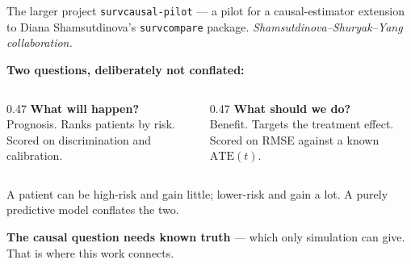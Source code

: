 \documentclass[aspectratio=169]{beamer}
\begin{document}
\begin{frame}{The larger project}
  \small
  \texttt{survcausal-pilot} --- a pilot for a causal-estimator extension to Diana
  Shamsutdinova's \texttt{survcompare} package.
  \emph{Shamsutdinova--Shuryak--Yang collaboration.}

  \vspace{0.6em}
  \textbf{Two questions, deliberately not conflated:}
  \begin{columns}[T,totalwidth=\textwidth]
    \begin{column}{0.47\textwidth}
      \textbf{What will happen?}\\
      Prognosis. Ranks patients by risk. Scored on discrimination and calibration.
    \end{column}
    \begin{column}{0.47\textwidth}
      \textbf{What should we do?}\\
      Benefit. Targets the treatment effect. Scored on RMSE against a known
      $\mathrm{ATE}(t)$.
    \end{column}
  \end{columns}

  \vspace{0.6em}
  A patient can be high-risk and gain little; lower-risk and gain a lot. A purely
  predictive model conflates the two.

  \vspace{0.4em}
  \textcolor{accent}{\textbf{The causal question needs known truth}} --- which only
  simulation can give. That is where this work connects.
\end{frame}
\end{document}
